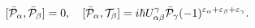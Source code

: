 \begin{equation}\label{5.5}
[\bar{\cal P}_\alpha,\bar{\cal P}_\beta]=0,\quad
[\bar{\cal P}_\alpha,{\cal T}_\beta]=i\hbar U^\gamma_{\alpha\beta}\bar{\cal
P}_\gamma (-1)^{\varepsilon_\alpha+\varepsilon_\beta+\varepsilon_\gamma}.
\end{equation}

